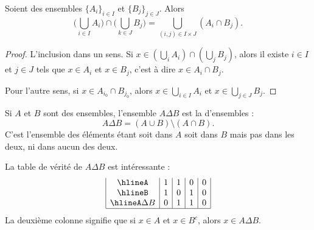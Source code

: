 \begin{lemma}	\label{LEMooPWUHooMBKquL}
	Soient des ensembles \( \{ A_i \}_{i\in I}\) et \( \{ B_j \}_{j\in J}\). Alors
	\begin{equation}
		\Big( \bigcup_{i\in I}A_i \Big)\cap \Big( \bigcup_{k\in J}B_j \Big)=\bigcup_{(i,j)\in I\times J}(A_i\cap B_j).
	\end{equation}
\end{lemma}

\begin{proof}
	L'inclusion dans un sens. Si \( x\in (\bigcup_iA_i)\cap (\bigcup_{j}B_j)\), alors il existe \( i\in I\) et \( j\in J\) tels que \( x\in A_i\) et \( x\in B_j\), c'est à dire \( x\in A_i\cap B_j\).

	Pour l'autre sens, si \( x\in A_{i_0}\cap B_{j_0}\), alors \( x\in \bigcup_{i\in I}A_i \) et \( x\in \bigcup_{j\in J}B_j\).
\end{proof}

\begin{definition}    \label{DefBMLooVjlSG}
	Si \( A\) et \( B\) sont des ensembles, l'ensemble \( A\Delta B\) est la  d'ensembles :
	\begin{equation}
		A\Delta B=(A\cup B)\setminus(A\cap B).
	\end{equation}
	C'est l'ensemble des éléments étant soit dans \( A\) soit dans \( B\) mais pas dans les deux, ni dans aucun des deux.
\end{definition}

\begin{remark}\label{REMooTableVeriteDiffSym}
	La table de vérité de \( A\Delta B\) est intéressante :
	\begin{equation}        \label{EQooOJBOooKkKbYp}
		\begin{array}{|c|c|c|c|c|}
			\hline%
			A         & 1 & 1 & 0 & 0 \\
			\hline%
			B         & 1 & 0 & 1 & 0 \\
			\hline%
			A\Delta B & 0 & 1 & 1 & 0 \\
			\hline%
		\end{array}
	\end{equation}
	La deuxième colonne signifie que si \( x\in A\) et \( x\in B^c\), alors \( x\in A\Delta B\).
\end{remark}


